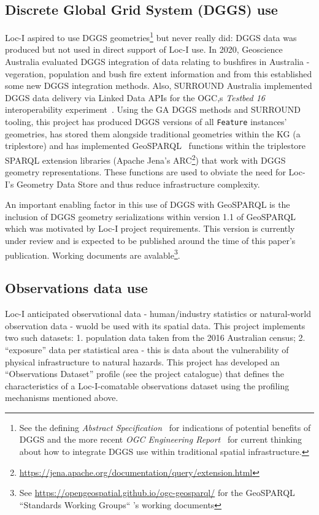 \documentclass[runningheads]{llncs}
\begin{document}
\subsection{Discrete Global Grid System (DGGS) use}
Loc-I aspired to use DGGS geometries\footnote{See the defining \textit{Abstract Specification}~\cite{purss_topic_2017} for indications of potential benefits of 
DGGS and the more recent \textit{OGC Engineering Report}~\cite{gibb_ogc_2021} for current thinking about how to integrate DGGS use within traditional spatial 
infrastructure.} but never really did: DGGS data was produced but not used in direct support of Loc-I use. In 2020, Geoscience Australia evaluated DGGS integration of data
relating to bushfires in Australia - vegeration, population and bush fire extent information and from this established some new DGGS integration methods. Also, SURROUND Australia
implemented DGGS data delivery via Linked Data APIs for the OGC,s \textit{Testbed 16} interoperability experiment~\cite{gibb_ogc_2021}.
Using the GA DGGS methods and SURROUND tooling, this project has produced DGGS versions of all \texttt{Feature} instances' 
geometries, has stored them alongside traditional geometries within the KG (a triplestore) and has implemented GeoSPARQL~\cite{open2012ogc} functions
within the triplestore SPARQL extension libraries (Apache Jena's ARC\footnote{\url{https://jena.apache.org/documentation/query/extension.html}}) that work with 
DGGS geometry representations. These functions are used to obviate the need for Loc-I's Geometry Data Store and thus reduce infrastructure complexity.

An important enabling factor in this use of DGGS with GeoSPARQL is the inclusion of DGGS geometry serializations within version 1.1 of GeoSPARQL which was motivated
by Loc-I project requirements. This version is currently under review and is expected to be published around the time of this paper's publication. Working documents 
are avalable\footnote{See \url{https://opengeospatial.github.io/ogc-geosparql/} for the GeoSPARQL ``Standards Working Groups`` 's working documents}.

\subsection{Observations data use}
Loc-I anticipated observational data - human/industry statistics or natural-world observation data - wuold be used with its spatial data. This project
implements two such datasets: 1. population data taken from the 2016 Australian census; 2. ``exposure'' data per statistical area - this is data about the vulnerability
of physical infrastructure to natural hazards. This project has developed an ``Observations Dataset'' profile (see the project catalogue) that defines the characteristics of a Loc-I-comatable 
observations dataset using the profiling mechanisms mentioned above.
\end{document}
